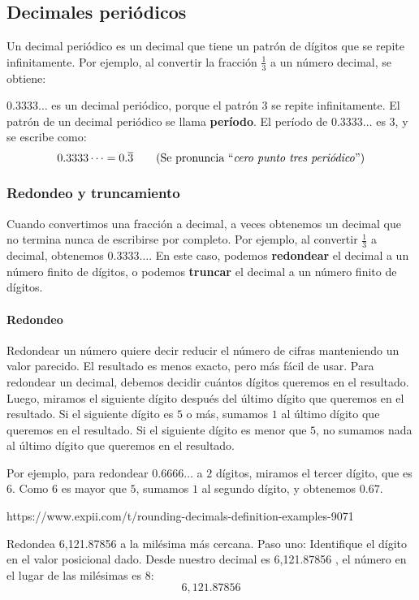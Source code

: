 \subsection{Decimales peri\'odicos}
Un decimal periódico es un decimal que tiene un patrón de dígitos que se repite infinitamente. Por ejemplo, al convertir la fracción $\frac{1}{3}$ a un número decimal, se obtiene:
\begin{center}
\end{center}
$0.3333\dots$ es un decimal periódico, porque el patrón $3$ se repite infinitamente. El patrón de un decimal periódico se llama \textbf{período}. El período de $0.3333\dots$ es $3$, y se escribe como:
\[0.3333\dots=0.\overline{3} \qquad \text{(Se pronuncia ``\emph{cero punto tres periódico}'')}\]

\subsubsection{Redondeo y truncamiento}
Cuando convertimos una fracción a decimal, a veces obtenemos un decimal que no termina nunca de escribirse por completo. Por ejemplo, al convertir $\frac{1}{3}$ a decimal, obtenemos $0.3333\dots$. En este caso, podemos \textbf{redondear} el decimal a un número finito de dígitos, o podemos \textbf{truncar} el decimal a un número finito de dígitos.

\paragraph{Redondeo} Redondear un número quiere decir reducir el número de cifras manteniendo un valor parecido. El resultado es menos exacto, pero más fácil de usar. Para redondear un decimal, debemos decidir cuántos dígitos queremos en el resultado. Luego, miramos el siguiente dígito después del último dígito que queremos en el resultado. Si el siguiente dígito es $5$ o más, sumamos $1$ al último dígito que queremos en el resultado. Si el siguiente dígito es menor que $5$, no sumamos nada al último dígito que queremos en el resultado.

Por ejemplo, para redondear $0.6666\dots$ a $2$ dígitos, miramos el tercer dígito, que es $6$. Como $6$ es mayor que $5$, sumamos $1$ al segundo dígito, y obtenemos $0.67$.

https://www.expii.com/t/rounding-decimals-definition-examples-9071

Redondea 6,121.87856 a la milésima más cercana.
Paso uno: Identifique el dígito en el valor posicional dado. Desde nuestro decimal
es 6,121.87856 , el número en el lugar de las milésimas es 8:
\[6,121.87\boxed{8}56\]


